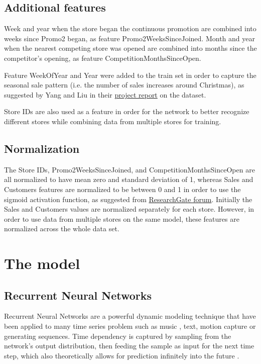 \documentclass[DIV=calc, paper=a4, fontsize=11pt, twocolumn]{scrartcl}
\begin{document}
\subsection{Additional features}
Week and year when the store began the continuous promotion are combined into weeks since Promo2 began, as feature Promo2WeeksSinceJoined. Month and year when the nearest competing store was opened are combined into months since the competitor's opening, as feature CompetitionMonthsSinceOpen.

Feature WeekOfYear and Year were added to the train set in order to capture the seasonal sale pattern (i.e. the number of sales increases around Christmas), as suggested by Yang and Liu in their \href{http://cs229.stanford.edu/proj2015/215_report.pdf}{project report} on the dataset.

Store IDs are also used as a feature in order for the network to better recognize different stores while combining data from multiple stores for training.

\subsection{Normalization}
The Store IDs, Promo2WeeksSinceJoined, and CompetitionMonthsSinceOpen are all normalized to have mean zero and standard deviation of 1, whereas Sales and Customers features are normalized to be between 0 and 1 in order to use the sigmoid activation function, as suggested from \href{https://www.researchgate.net/post/Which_activation_function_should_be_used_in_a_prediction_model}{ResearchGate forum}. Initially the Sales and Customers values are normalized separately for each store. However, in order to use data from multiple stores on the same model, these features are normalized across the whole data set.

\section{The model}
\subsection{Recurrent Neural Networks}
Recurrent Neural Networks are a powerful dynamic modeling technique that have been applied to many time series problem such as music , text, motion capture or generating sequences. Time dependency is captured by sampling from the network's output distribution, then feeding the sample as input for the next time step, which also theoretically allows for prediction infinitely into the future \cite{DBLP:journals/corr/Graves13}.
\end{document}
